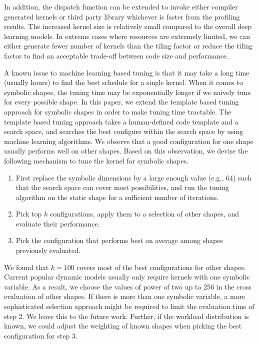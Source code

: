 In addition, the dispatch function can be extended to invoke either compiler generated kernels
  or third party library whichever is faster from the profiling results.
The increased kernel size is relatively small compared to the overall deep learning models.
In extreme cases where resources are extremely limited,
  we can either generate fewer number of kernels than the tiling factor
  or reduce the tiling factor to find an acceptable trade-off
  between code size and performance.

A known issue to machine learning based tuning is that it may take a long time (usually hours) to find
  the best schedule for a single kernel.
When it comes to symbolic shapes, the tuning time may be exponentially longer if we
  naively tune for every possible shape.
In this paper, we extend the template based tuning approach for
  symbolic shapes in order to make tuning time tractable.
The template based tuning approach takes a human-defined
  code template and a search space, and searches the best configure
  within the search space by using machine learning algorithms.
We observe that a good configuration for one shape usually performs
  well on other shapes.
Based on this observation, we devise the following mechanism
  to tune the kernel for symbolic shapes.

\begin{enumerate}
    \item First replace the symbolic dimensions by a large enough value (e.g., 64) such that the search space can cover most possibilities, and run the tuning algorithm on the static shape for a sufficient number of iterations.
    \item Pick top $k$ configurations, apply them to a selection of other shapes, and evaluate their performance.
    \item Pick the configuration that performs best on average among shapes previously evaluated.
\end{enumerate}

We found that $k=100$ covers most of the best configurations for other shapes.
Current popular dynamic models usually only require kernels with one symbolic variable.
As a result, we choose the values of power of two up to 256 in the cross evaluation of other shapes.
If there is more than one symbolic variable, a more sophisticated selection approach might be
  required to limit the evaluation time of step 2.
We leave this to the future work.
Further, if the workload distribution is known, we could adjust the weighting of known shapes when picking the best configuration for step 3.


